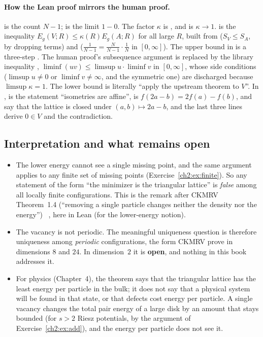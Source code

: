 \paragraph{How the Lean proof mirrors the human proof.}  is the count $N-1$;
 is the limit $1-0$. The factor $\kappa$ is , and  is
$\kappa\to1$.  is the inequality $E_g(V;R)\le\kappa(R)E_g(A;R)$ for all large $R$, built
from  ($S_V\le S_A$, by dropping terms) and  ($\frac1{N-1}=\frac N{N-1}\cdot\frac1N$ in
$[0,\infty]$). The upper bound in  is a three-step . The human proof's subsequence
argument is replaced by the library inequality ,
$\liminf(uv)\le\limsup u\cdot\liminf v$ in $[0,\infty]$, whose side conditions ($\limsup u\neq0$ or $\liminf v\neq\infty$,
and the symmetric one) are discharged because $\limsup\kappa=1$. The lower bound is literally ``apply the upstream
theorem to $V$''. In ,  is the
statement ``isometries are affine'',  is $f(2a-b)=2f(a)-f(b)$,  and 
say that the lattice is closed under $(a,b)\mapsto2a-b$, and the last three lines derive $0\in V$ and the contradiction.

\subsection{Interpretation and what remains open}
\begin{itemize}
\item \tierC{} The lower energy cannot see a single missing point, and the same argument applies to any finite set of
  missing points (Exercise~\ref{ch2:ex:finite}). So any statement of the form ``the minimizer is the triangular
  lattice'' is \emph{false} among all locally finite configurations. This is the remark after CKMRV Theorem~1.4
  (``removing a single particle changes neither the density nor the energy'')~\cite{ckmrv} \tierL, here in Lean
  \tierA{} (for the lower-energy notion).
\item \tierC{} The vacancy is not periodic. The meaningful uniqueness question is therefore uniqueness among
  \emph{periodic} configurations, the form CKMRV prove in dimensions $8$ and $24$. In dimension~$2$ it is \textbf{open},
  and nothing in this book addresses it.
\item \tierC{} For physics (Chapter~4), the theorem says that the triangular lattice has the least energy per particle
  in the bulk; it does not say that a physical system will be found in that state, or that defects cost energy per
  particle. A single vacancy changes the total pair energy of a large disk by an amount that stays bounded (for
  $s>2$ Riesz potentials, by the argument of Exercise~\ref{ch2:ex:add}), and the energy per particle does not see it.
\end{itemize}

